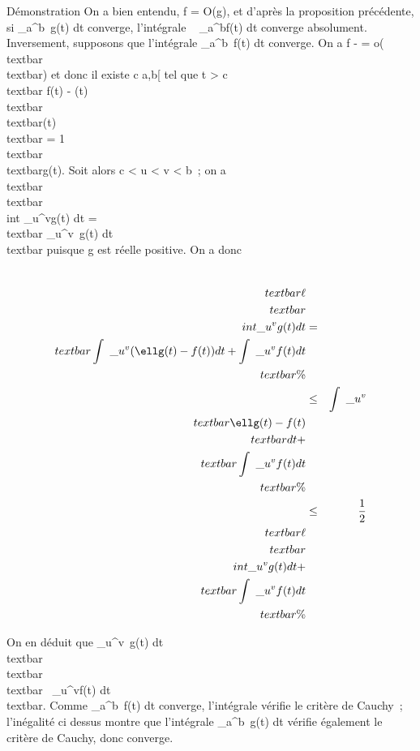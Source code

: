\documentclass[]{article}
\begin{document}
Démonstration On a bien entendu, f = O(g), et d'après la proposition
précédente, si \int  \_a^b~g(t) dt
converge, l'intégrale \int ~
\_a^bf(t) dt converge absolument. Inversement, supposons
que l'intégrale \int  \_a^b~f(t) dt
converge. On a f - \ellg =
o(\\textbar{}\ellg\\textbar{}) et donc il
existe c \in {[}a,b{[} tel que t \textgreater{} c
\rigtharrow~\\textbar{} f(t) - \ellg(t)\\textbar{} 
\\textbar{}\ellg(t)\\textbar{} = 1
\\textbar{}\ell\\textbar{}g(t). Soit alors c
\textless{} u \textless{} v \textless{} b~; on a
\\textbar{}\ell\\textbar{}\\int
 \_u^vg(t) dt =\\textbar{}
\ell\int  \_u^v~g(t)
dt\\textbar{} puisque g est réelle positive. On a donc

\begin{align*}
\\textbar{}\ell\\textbar{}\\int
 \_u^vg(t) dt& =&
\\textbar{}\int ~
\_u^v(\ellg(t) - f(t)) dt +\int ~
\_u^vf(t) dt\\textbar{}\%&
\\ & \leq& \int ~
\_u^v\\textbar{}\ellg(t) -
f(t)\\textbar{} dt
+\\textbar{}\int ~
\_u^vf(t) dt\\textbar{} \%&
\\ & \leq& 1 \over 2
\\textbar{}\ell\\textbar{}\\int
 \_u^vg(t) dt
+\\textbar{}\int ~
\_u^vf(t) dt\\textbar{} \%&
\\ \end{align*}

On en déduit que \int  \_u^v~g(t)
dt  \over
\\textbar{}\ell\\textbar{}
\\textbar{}\int ~
\_u^vf(t) dt\\textbar{}. Comme
\int  \_a^b~f(t) dt converge,
l'intégrale vérifie le critère de Cauchy~; l'inégalité ci dessus montre
que l'intégrale \int  \_a^b~g(t) dt
vérifie également le critère de Cauchy, donc converge.
\end{document}
